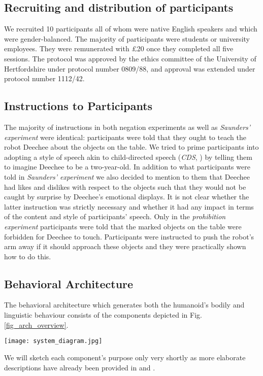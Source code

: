\subsection{Recruiting and distribution of participants} We recruited 10 participants all of whom were native English speakers and which were gender-balanced. 
The majority of participants were students or university employees. They were remunerated with \pounds 20 once they completed all five sessions. The protocol
was approved by the ethics committee of the University of Hertfordshire under protocol number 0809/88, and approval was extended under protocol number 1112/42.

\subsection{Instructions to Participants} The majority of instructions in both negation experiments as well as \emph{Saunders' experiment} \cite{Saunders2012} were
identical: participants were told that they ought to teach the robot Deechee about the objects on the table. We tried to prime participants into adopting
a style of speech akin to child-directed speech (\textit{CDS}, \cite{Snow1977,Gallaway1994,Newport1977}) by telling them to imagine Deechee to be a two-year-old. 
In addition to what participants were told in \emph{Saunders' experiment} we also decided to mention to them that Deechee had likes and dislikes with
respect to the objects such that they would not be caught by surprise by Deechee's emotional displays. It is not clear whether the latter instruction was strictly
necessary and whether it had any impact in terms of the content and style of participants' speech. Only in the \emph{prohibition experiment} participants
were told that the marked objects on the table were forbidden for Deechee to touch. Participants were instructed to push the robot's arm away if it should
approach these objects and they were practically shown how to do this.

\subsection{Behavioral Architecture}\label{sec_bhv_arch} The behavioral architecture which generates both the humanoid's bodily and linguistic behaviour consists
of the components depicted in Fig. \ref{fig_arch_overview}.
\begin{figure*}[ht]
  \begin{center}
    \texttt{[image: system\_diagram.jpg]}
    \caption{\textbf{Functional overview of robotic architecture for language acquisition}. Solid lines indicate components
      that are active during experimental sessions (``online''), dotted lines indicate components that work offline.}
    \label{fig_arch_overview}
  \end{center}
\end{figure*}
We will sketch each component's purpose only very shortly as more elaborate descriptions have already been provided in \cite{Foerster2017} and \cite{Foerster2013}.

